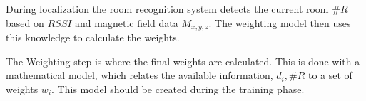During localization the room recognition system detects the current room \(\#R\) based on \(RSSI\) and magnetic field data \(M_{x,y,z}\). The weighting model then uses this knowledge to calculate the weights. 

The Weighting step is where the final weights are calculated. This is done with a mathematical model, which relates the available information, \(d_i,\#R\) to a set of weights \(w_i\). This model should be created during the training phase.